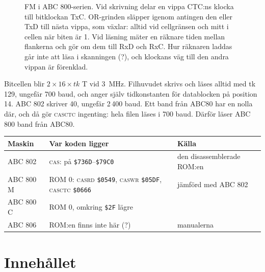 \documentclass[10pt]{article}
\newcommand\adr[1]{\texttt{\$#1}}
\newcommand\namn[1]{\textsc{\MakeLowercase{#1}}}
\begin{document}
\begin{figure}[H]
\caption{FM i ABC 800-serien. Vid skrivning delar en vippa CTC:ns klocka
till bitklockan TxC. OR-grinden släpper igenom antingen den eller TxD till
nästa vippa, som växlar: alltid vid cellgränsen och mitt i cellen när
biten är 1. Vid läsning mäter en räknare tiden mellan flankerna och gör om
dem till RxD och RxC. Hur räknaren laddas går inte att läsa i skanningen
(?), och klockans väg till den andra vippan är förenklad.}
\end{figure}

Bitcellen blir $2 \times 16 \times \mathit{tk}$ T vid 3~MHz. Filhuvudet
skrivs och läses alltid med tk 129, ungefär 700 baud, och anger själv
tidkonstanten för datablocken på position 14. ABC 802 skriver 40, ungefär
2\,400 baud. Ett band från ABC80 har en nolla där, och då gör \namn{CASCTC}
ingenting: hela filen läses i 700 baud. Därför läser ABC 800 band från
ABC80.

\begin{center}
\small
\begin{tabular}{@{}lll@{}}
\toprule
Maskin & Var koden ligger & Källa \\
\midrule
ABC 802 & \namn{CAS:} på \adr{736D}--\adr{79C0} & den disassemblerade ROM:en \\
ABC 800 M & ROM 0: \namn{CASRD} \adr{0549}, \namn{CASWR} \adr{05DF}, \namn{CASCTC} \adr{0666} & jämförd med ABC 802 \\
ABC 800 C & ROM 0, omkring \adr{2F} lägre & \\
ABC 806 & ROM:en finns inte här (?) & manualerna \\
\bottomrule
\end{tabular}
\end{center}

\section{Innehållet}
\end{document}
